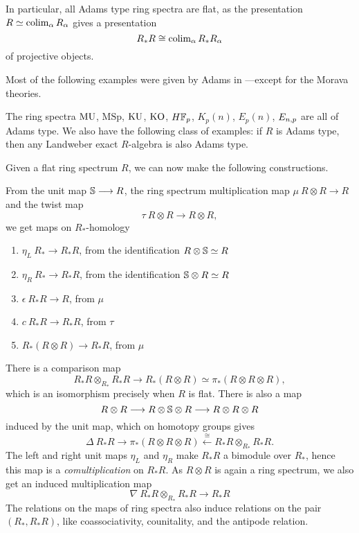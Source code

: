 \begin{remark}
    In particular, all Adams type ring spectra are flat, as the presentation $R\simeq \colim_\alpha R_\alpha$ gives a presentation
    \[R_*R\cong \colim_\alpha R_*R_\alpha\] 
    of projective objects. 
\end{remark}

Most of the following examples were given by Adams in \cite[III.13.4]{adams_74}---except for the Morava theories.

\begin{example}
    \label{ch0:ex:adams-type-ring-spectra}
    The ring spectra $\MU$, $\mathrm{MSp}$, $\KU$, $\KO$, $H\F_p$, $K_p(n)$, $E_p(n)$, $E\np$ are all of Adams type. We also have the following class of examples: if $R$ is Adams type, then any Landweber exact $R$-algebra is also Adams type. 
\end{example}

Given a flat ring spectrum $R$, we can now make the following constructions. 

\begin{construction}
    \label{ch0:const:hopf-algebroid-maps-from-spectra}
    From the unit map $\S\longrightarrow R$, the ring spectrum multiplication map $\mu\: R\otimes R\longrightarrow R$ and the twist map 
    \[\tau\: R\otimes R\longrightarrow R\otimes R,\] 
    we get maps on $R_*$-homology
    \begin{enumerate}
        \item $\eta_L\: R_*\longrightarrow R_*R$, from the identification $R\otimes \S\simeq R$
        \item $\eta_R\: R_*\longrightarrow R_*R$, from the identification $\S\otimes R\simeq R$
        \item $\epsilon\: R_*R\longrightarrow R$, from $\mu$
        \item $c\: R_*R\longrightarrow R_*R$, from $\tau$
        \item $R_*(R\otimes R)\longrightarrow R_*R$, from $\mu$
    \end{enumerate}
    There is a comparison map
    \[R_*R\otimes_{R_*}R_*R\longrightarrow R_*(R\otimes R)\simeq \pi_*(R\otimes R\otimes R),\]
    which is an isomorphism precisely when $R$ is flat. There is also a map 
    \[R\otimes R \to R\otimes \S \otimes R \to R\otimes R\otimes R\]
    induced by the unit map, which on homotopy groups gives 
    \[\Delta\: R_*R \to \pi_*(R\otimes R\otimes R)\overset{\cong}\longleftarrow R_*R\otimes_{R_*}R_*R.\]
    The left and right unit maps $\eta_L$ and $\eta_R$ make $R_*R$ a bimodule over $R_*$, hence this map is a \emph{comultiplication} on $R_*R$. As $R\otimes R$ is again a ring spectrum, we also get an induced multiplication map  
    \[\nabla \: R_*R\otimes_{R_*}R_*R\longrightarrow R_*R\]
    The relations on the maps of ring spectra also induce relations on the pair $(R_*, R_*R)$, like coassociativity, counitality, and the antipode relation.   
\end{construction}

